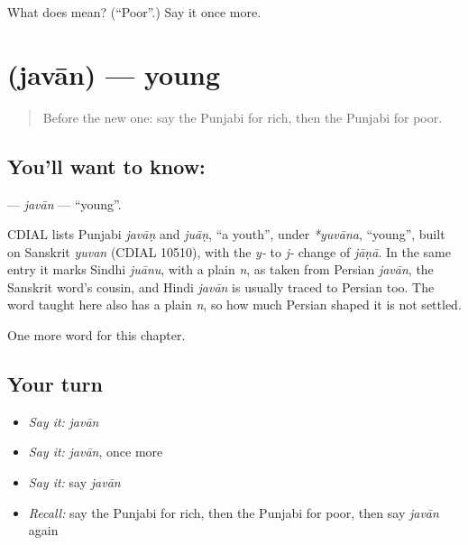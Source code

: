 \begin{tcolorbox}[breakable,colback=teal!4,colframe=teal!35!black,title={Before you move on}]
What does  mean? (\textquotedblleft{}Poor\textquotedblright{}.) Say it once more.
\end{tcolorbox}
\section[\texorpdfstring{\pa{ਜਵਾਨ} (javān)}{ਜਵਾਨ (javān)}]{ (javān) — young}

\label{lesson:PA-C147-javan}



\begin{quote}
Before the new one: say the Punjabi for rich, then the Punjabi for poor.
\end{quote}

\subsection*{You'll want to know: }
\textbf{} — \emph{javān} — \textquotedblleft{}young\textquotedblright{}.

\begin{cousinweb}
CDIAL lists Punjabi \emph{javāṇ} and \emph{juāṇ}, \textquotedblleft{}a youth\textquotedblright{}, under \emph{*yuvāna}, \textquotedblleft{}young\textquotedblright{}, built on Sanskrit \emph{yuvan} (CDIAL 10510), with the \emph{y-} to \emph{j-} change of \emph{jāṇā}. In the same entry it marks Sindhi \emph{juānu}, with a plain \emph{n}, as taken from Persian \emph{javān}, the Sanskrit word's cousin, and Hindi \emph{javān} is usually traced to Persian too. The word taught here also has a plain \emph{n}, so how much Persian shaped it is not settled.
\end{cousinweb}

\begin{grammarlens}[title={What you've built}]
One more word for this chapter.
\end{grammarlens}

\subsection*{Your turn}
\begin{itemize}
\raggedright
  \item \emph{Say it:} \emph{javān}
  \item \emph{Say it:} \emph{javān}, once more
  \item \emph{Say it:} say \emph{javān}
  \item \emph{Recall:} say the Punjabi for rich, then the Punjabi for poor, then say \emph{javān} again
\end{itemize}

